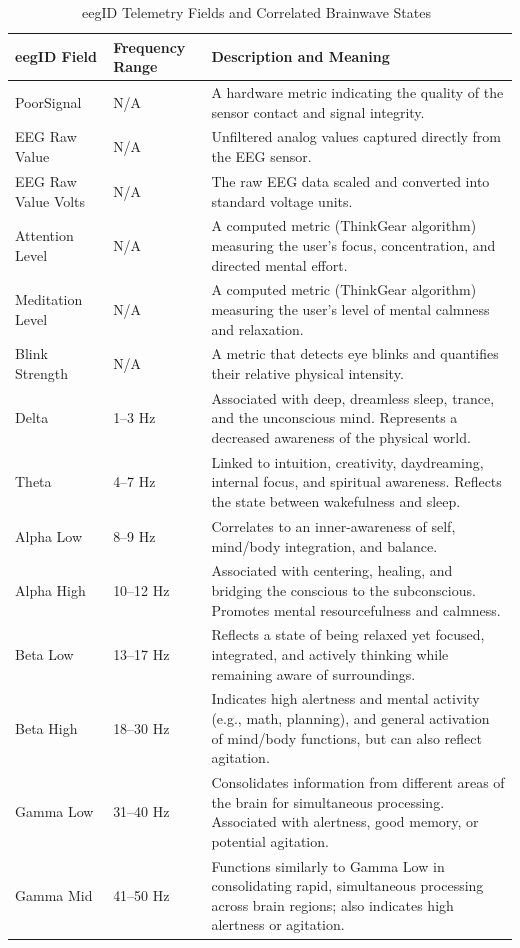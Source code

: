 \documentclass[journal]{IEEEtran}
\begin{document}
\begin{table}[t]
    \centering
    \caption{eegID Telemetry Fields and Correlated Brainwave States~\cite{neurosky2026eegid,neurohealth_2019}}
    \label{tab:eegid_brainwaves}
    \begin{tabularx}{\textwidth}{l l X}
        \hline
        \textbf{eegID Field} & \textbf{Frequency Range} & \textbf{Description and Meaning} \\
        \hline
        PoorSignal & N/A & A hardware metric indicating the quality of the sensor contact and signal integrity. \\
        EEG Raw Value & N/A & Unfiltered analog values captured directly from the EEG sensor. \\
        EEG Raw Value Volts & N/A & The raw EEG data scaled and converted into standard voltage units. \\
        Attention Level & N/A & A computed metric (ThinkGear algorithm) measuring the user's focus, concentration, and directed mental effort. \\
        Meditation Level & N/A & A computed metric (ThinkGear algorithm) measuring the user's level of mental calmness and relaxation. \\
        Blink Strength & N/A & A metric that detects eye blinks and quantifies their relative physical intensity. \\
        Delta & 1--3 Hz & Associated with deep, dreamless sleep, trance, and the unconscious mind. Represents a decreased awareness of the physical world. \\
        Theta & 4--7 Hz & Linked to intuition, creativity, daydreaming, internal focus, and spiritual awareness. Reflects the state between wakefulness and sleep. \\
        Alpha Low & 8--9 Hz & Correlates to an inner-awareness of self, mind/body integration, and balance. \\
        Alpha High & 10--12 Hz & Associated with centering, healing, and bridging the conscious to the subconscious. Promotes mental resourcefulness and calmness. \\
        Beta Low & 13--17 Hz & Reflects a state of being relaxed yet focused, integrated, and actively thinking while remaining aware of surroundings. \\
        Beta High & 18--30 Hz & Indicates high alertness and mental activity (e.g., math, planning), and general activation of mind/body functions, but can also reflect agitation. \\
        Gamma Low & 31--40 Hz & Consolidates information from different areas of the brain for simultaneous processing. Associated with alertness, good memory, or potential agitation. \\
        Gamma Mid & 41--50 Hz & Functions similarly to Gamma Low in consolidating rapid, simultaneous processing across brain regions; also indicates high alertness or agitation. \\
        \hline
    \end{tabularx}
\end{table}



\end{document}
